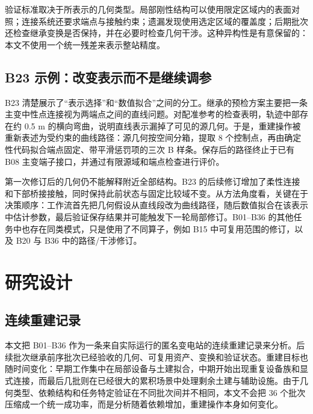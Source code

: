 \documentclass[10pt,a4paper]{article}
\begin{document}
验证标准取决于所表示的几何类型。局部刚性结构可以使用限定区域内的表面对照；连接系统还要求端点与接触约束；遗漏发现使用选定区域的覆盖度；后期批次还检查继承变换是否保持，并在必要时检查几何干涉。这种异构性是有意保留的：本文不使用一个统一残差来表示整站精度。

\hypertarget{b23-ux793aux4f8bux6539ux53d8ux8868ux793aux800cux4e0dux662fux7ee7ux7eedux8c03ux53c2}{%
\subsection{B23
示例：改变表示而不是继续调参}\label{b23-ux793aux4f8bux6539ux53d8ux8868ux793aux800cux4e0dux662fux7ee7ux7eedux8c03ux53c2}}

B23
清楚展示了``表示选择''和``数值拟合''之间的分工。继承的预检方案主要把一条主变中性点连接视为两端点之间的直线问题。对配准参考的检查表明，轨迹中部存在约
0.5 m
的横向弯曲，说明直线表示漏掉了可见的源几何。于是，重建操作被重新表述为受约束的曲线路径：源几何按空间分箱，提取
8 个控制点，再由确定性代码拟合端点固定、带平滑惩罚项的三次 B
样条。保存后的路径终止于已有 B08
主变端子接口，并通过有限源域和端点检查进行评价。

第一次修订后的几何仍不能解释附近全部结构。B23
的后续修订增加了柔性连接和下部桥接接触，同时保持此前状态与固定比较域不变。从方法角度看，关键在于决策顺序：工作流首先把几何假设从直线段改为曲线路径，随后数值拟合在该表示中估计参数，最后验证保存结果并可能触发下一轮局部修订。B01--B36
的其他任务中也存在同类模式，只是使用了不同算子，例如 B15
中可复用范围的修订，以及 B20 与 B36 中的路径/干涉修订。

\hypertarget{ux7814ux7a76ux8bbeux8ba1}{%
\section{研究设计}\label{ux7814ux7a76ux8bbeux8ba1}}

\hypertarget{ux8fdeux7eedux91cdux5efaux8bb0ux5f55}{%
\subsection{连续重建记录}\label{ux8fdeux7eedux91cdux5efaux8bb0ux5f55}}

本文把 B01--B36
作为一条来自实际运行的匿名变电站的连续重建记录来分析。后续批次继承前序批次已经验收的几何、可复用资产、变换和验证状态。重建目标也随时间变化：早期工作集中在局部设备与土建拟合，中期开始出现重复设备族和显式连接，而最后几批则在已经很大的累积场景中处理剩余土建与辅助设施。由于几何类型、依赖结构和任务特定验证在不同批次间并不相同，本文不会把
36
个批次压缩成一个统一成功率，而是分析随着依赖增加，重建操作本身如何变化。
\end{document}
